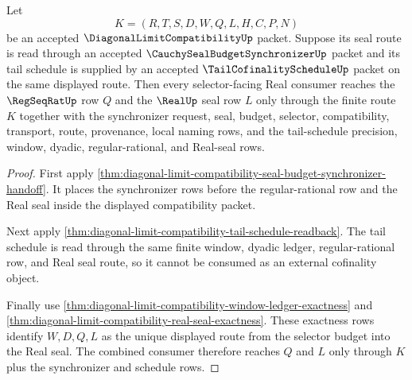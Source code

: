 \begin{theorem}
\label{thm:diagonal-limit-compatibility-synchronizer-tail-selector-real-route}
Let
$$
K=(R,T,S,D,W,Q,L,H,C,P,N)
$$
be an accepted $\DiagonalLimitCompatibilityUp$ packet. Suppose its seal route is read through an accepted $\CauchySealBudgetSynchronizerUp$ packet and its tail schedule is supplied by an accepted $\TailCofinalityScheduleUp$ packet on the same displayed route. Then every selector-facing Real consumer reaches the $\RegSeqRatUp$ row $Q$ and the $\RealUp$ seal row $L$ only through the finite route $K$ together with the synchronizer request, seal, budget, selector, compatibility, transport, route, provenance, local naming rows, and the tail-schedule precision, window, dyadic, regular-rational, and Real-seal rows.
\end{theorem}
\begin{proof}
First apply \autoref{thm:diagonal-limit-compatibility-seal-budget-synchronizer-handoff}. It places the synchronizer rows before the regular-rational row and the Real seal inside the displayed compatibility packet.

Next apply \autoref{thm:diagonal-limit-compatibility-tail-schedule-readback}. The tail schedule is read through the same finite window, dyadic ledger, regular-rational row, and Real seal route, so it cannot be consumed as an external cofinality object.

Finally use \autoref{thm:diagonal-limit-compatibility-window-ledger-exactness} and \autoref{thm:diagonal-limit-compatibility-real-seal-exactness}. These exactness rows identify $W,D,Q,L$ as the unique displayed route from the selector budget into the Real seal. The combined consumer therefore reaches $Q$ and $L$ only through $K$ plus the synchronizer and schedule rows.
\end{proof}

